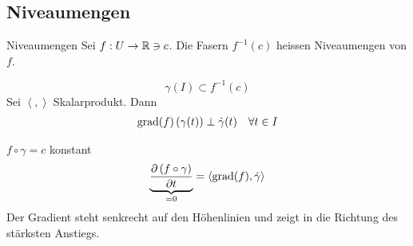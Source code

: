 \subsection{Niveaumengen}
\begin{Def}{Niveaumengen}
  Sei $f:U\to\mathbb{R}\ni c$. Die Fasern $f^{-1}(c)$ heissen Niveaumengen von $f$.
\end{Def}
\begin{Sat}
  \[\gamma(I)\subset f^{-1}(c)\]
  Sei $\left\langle , \right\rangle$ Skalarprodukt. Dann
  \begin{align*}
    \operatorname{grad}(f)\left( \gamma(t) \right)\perp\dot\gamma(t)&&\forall t\in I
  \end{align*}
\end{Sat}
\begin{Bew}
  $f\circ \gamma=c$ konstant
  \[\underbrace{\dfrac{\partial \left( f\circ \gamma \right)}{\partial t}}_{=0}=\left\langle \operatorname{grad}(f),\dot\gamma \right\rangle \]
  Der Gradient steht senkrecht auf den Höhenlinien und zeigt in die Richtung des stärksten Anstiegs.
\end{Bew}
